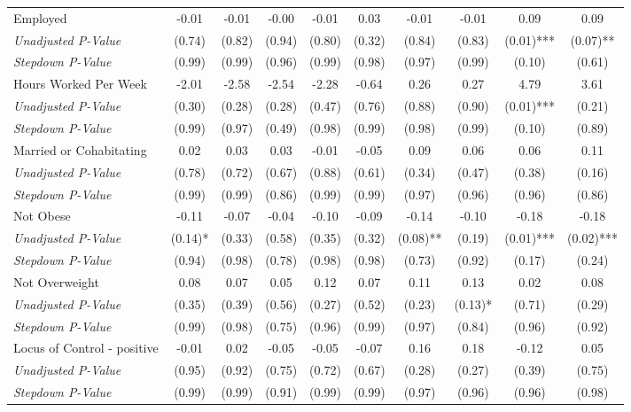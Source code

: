 \begin{tabular}{l c c c c c c c c c}
Employed & -0.01 & -0.01 & -0.00 & -0.01 & 0.03 & -0.01 & -0.01 & 0.09 & 0.09 \\
\quad \textit{Unadjusted P-Value} & (0.74) & (0.82) & (0.94) & (0.80) & (0.32) & (0.84) & (0.83) & (0.01)*** & (0.07)** \\
\quad \textit{Stepdown P-Value} & (0.99) & (0.99) & (0.96) & (0.99) & (0.98) & (0.97) & (0.99) & (0.10) & (0.61) \\
Hours Worked Per Week & -2.01 & -2.58 & -2.54 & -2.28 & -0.64 & 0.26 & 0.27 & 4.79 & 3.61 \\
\quad \textit{Unadjusted P-Value} & (0.30) & (0.28) & (0.28) & (0.47) & (0.76) & (0.88) & (0.90) & (0.01)*** & (0.21) \\
\quad \textit{Stepdown P-Value} & (0.99) & (0.97) & (0.49) & (0.98) & (0.99) & (0.98) & (0.99) & (0.10) & (0.89) \\
Married or Cohabitating & 0.02 & 0.03 & 0.03 & -0.01 & -0.05 & 0.09 & 0.06 & 0.06 & 0.11 \\
\quad \textit{Unadjusted P-Value} & (0.78) & (0.72) & (0.67) & (0.88) & (0.61) & (0.34) & (0.47) & (0.38) & (0.16) \\
\quad \textit{Stepdown P-Value} & (0.99) & (0.99) & (0.86) & (0.99) & (0.99) & (0.97) & (0.96) & (0.96) & (0.86) \\
Not Obese & -0.11 & -0.07 & -0.04 & -0.10 & -0.09 & -0.14 & -0.10 & -0.18 & -0.18 \\
\quad \textit{Unadjusted P-Value} & (0.14)* & (0.33) & (0.58) & (0.35) & (0.32) & (0.08)** & (0.19) & (0.01)*** & (0.02)*** \\
\quad \textit{Stepdown P-Value} & (0.94) & (0.98) & (0.78) & (0.98) & (0.98) & (0.73) & (0.92) & (0.17) & (0.24) \\
Not Overweight & 0.08 & 0.07 & 0.05 & 0.12 & 0.07 & 0.11 & 0.13 & 0.02 & 0.08 \\
\quad \textit{Unadjusted P-Value} & (0.35) & (0.39) & (0.56) & (0.27) & (0.52) & (0.23) & (0.13)* & (0.71) & (0.29) \\
\quad \textit{Stepdown P-Value} & (0.99) & (0.98) & (0.75) & (0.96) & (0.99) & (0.97) & (0.84) & (0.96) & (0.92) \\
Locus of Control - positive & -0.01 & 0.02 & -0.05 & -0.05 & -0.07 & 0.16 & 0.18 & -0.12 & 0.05 \\
\quad \textit{Unadjusted P-Value} & (0.95) & (0.92) & (0.75) & (0.72) & (0.67) & (0.28) & (0.27) & (0.39) & (0.75) \\
\quad \textit{Stepdown P-Value} & (0.99) & (0.99) & (0.91) & (0.99) & (0.99) & (0.97) & (0.96) & (0.96) & (0.98) \\

\end{tabular}
